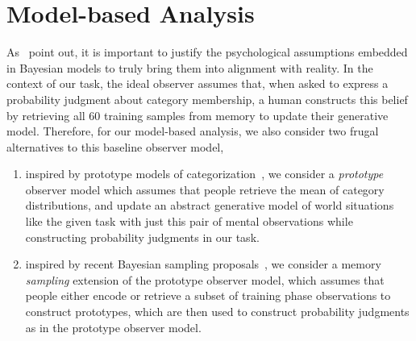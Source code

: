 \documentclass[10pt,letterpaper]{article}
\begin{document}



\section{Model-based Analysis}

As~ point out, it is important to justify the psychological assumptions embedded in Bayesian models to truly bring them into alignment with reality. In the context of our task, the ideal observer assumes that, when asked to express a probability judgment about category membership, a human constructs this belief by retrieving all 60 training samples from memory to update their generative model. Therefore, for our model-based analysis, we also consider two frugal alternatives to this baseline observer model,
\begin{enumerate}
    \item inspired by prototype models of categorization~\cite{fried1984induction, minda2001prototypes}, we consider a {\em prototype} observer model which assumes that people retrieve the mean of category distributions, and update an abstract generative model of world situations like the given task with just this pair of mental observations while constructing probability judgments in our task. 
    \item inspired by recent Bayesian sampling proposals~\cite{sanborn2016bayesian, zhu2020bayesian}, we consider a memory {\em sampling} extension of the prototype observer model, which assumes that people either encode or retrieve a subset of training phase observations to construct prototypes, which are then used to construct probability judgments as in the prototype observer model. 
\end{enumerate}
\end{document}
